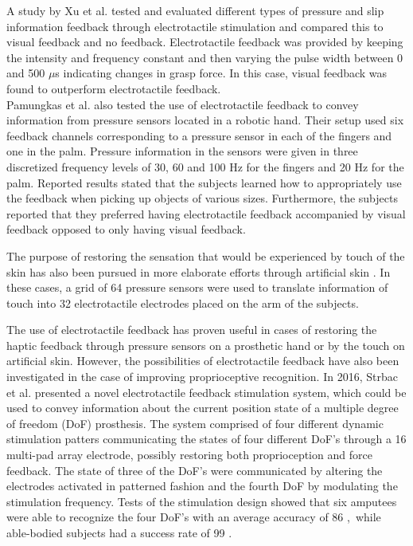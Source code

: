 A study by Xu et al. \cite{Xu2016} tested and evaluated different types of pressure and slip information feedback through electrotactile stimulation and compared this to visual feedback and no feedback. Electrotactile feedback was provided by keeping the intensity and frequency constant and then varying the pulse width between 0 and 500 $\mu $s indicating changes in grasp force. In this case, visual feedback was found to outperform electrotactile feedback. \cite{Xu2016} \\
Pamungkas et al. \cite{Pamungkas2015} also tested the use of electrotactile feedback to convey information from pressure sensors located in a robotic hand. Their setup used six feedback channels corresponding to a pressure sensor in each of the fingers and one in the palm. Pressure information in the sensors were given in three discretized frequency levels of 30, 60 and 100 Hz for the fingers and 20 Hz for the palm. Reported results stated that the subjects learned how to appropriately use the feedback when picking up objects of various sizes. Furthermore, the subjects reported that they preferred having electrotactile feedback accompanied by visual feedback opposed to only having visual feedback. \cite{Pamungkas2015} 

The purpose of restoring the sensation that would be experienced by touch of the skin has also been pursued in more elaborate efforts through artificial skin \cite{Hartmann2014,Franceschi2015}. In these cases, a grid of 64 pressure sensors were used to translate information of touch into 32 electrotactile electrodes placed on the arm of the subjects. 

The use of electrotactile feedback has proven useful in cases of restoring the haptic feedback through pressure sensors on a prosthetic hand or by the touch on artificial skin. However, the possibilities of electrotactile feedback have also been investigated in the case of improving proprioceptive recognition. In 2016, Strbac et al. \cite{Strbac2016} presented a novel electrotactile feedback stimulation system, which could be used to convey information about the current position state of a multiple degree of freedom (DoF) prosthesis. The system comprised of four different dynamic stimulation patters communicating the states of four different DoF's through a 16 multi-pad array electrode, possibly restoring both proprioception and force feedback. The state of three of the DoF's were communicated by altering the electrodes activated in patterned fashion and the fourth DoF by modulating the stimulation frequency. Tests of the stimulation design showed that six amputees were able to recognize the four DoF's with an average accuracy of 86 \percent,~while able-bodied subjects had a success rate of 99 \percent. \cite{Strbac2016}   

